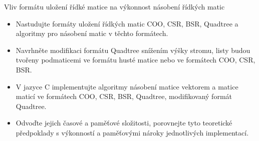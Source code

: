 \documentclass{beamer}
\newcommand{\backupbegin}{
   \newcounter{finalframe}
   \setcounter{finalframe}{\value{framenumber}}
}
\begin{document}
\begin{frame}
	\begin{exampleblock}{Vliv formátu uložení řídké matice na výkonnost násobení řídkých matic}
		\begin{itemize}
			\item[\checkmark] Nastudujte formáty uložení řídkých matic COO, CSR, BSR, Quadtree a algoritmy pro násobení matic v těchto formátech.
			\item[\checkmark] Navrhněte modifikaci formátu Quadtree snížením výšky stromu, listy budou tvořeny podmaticemi ve formátu husté matice nebo ve formátech COO, CSR, BSR.
			\item[\checkmark] V jazyce C implementujte algoritmy násobení matice vektorem a matice maticí ve formátech COO, CSR, BSR, Quadtree, modifikovaný formát Quadtree.
			\item[\checkmark] Odvoďte jejich časové a paměťové složitosti, porovnejte tyto teoretické předpoklady s výkonností a paměťovými nároky jednotlivých implementací.
		\end{itemize}
	\end{exampleblock}
\end{frame}





\backupbegin
\end{document}
